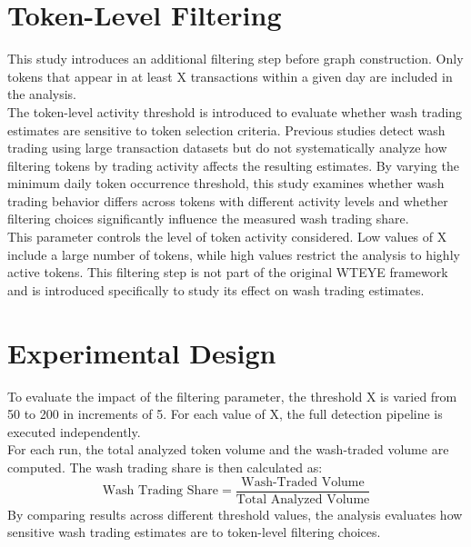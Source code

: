 \documentclass[language=english,thesis=bachelor,nosecondtitle,faculty=cb,onesided,13pt]{hsmw-thesis}
\begin{document}
	\section{Token-Level Filtering}
This study introduces an additional filtering step before graph construction. Only tokens that appear in at least X transactions within a given day are included in the analysis.\\
The token-level activity threshold is introduced to evaluate whether wash trading estimates are sensitive to token selection criteria. Previous studies detect wash trading using large transaction datasets but do not systematically analyze how filtering tokens by trading activity affects the resulting estimates. By varying the minimum daily token occurrence threshold, this study examines whether wash trading behavior differs across tokens with different activity levels and whether filtering choices significantly influence the measured wash trading share.\\
This parameter controls the level of token activity considered. Low values of X include a large number of tokens, while high values restrict the analysis to highly active tokens. This filtering step is not part of the original WTEYE framework and is introduced specifically to study its effect on wash trading estimates.\\

	\section{Experimental Design}
To evaluate the impact of the filtering parameter, the threshold X is varied from 50 to 200 in increments of 5. For each value of X, the full detection pipeline is executed independently.\\
For each run, the total analyzed token volume and the wash-traded volume are computed. The wash trading share is then calculated as:\\
\begin{equation}
    \text{Wash Trading Share} = \frac{\text{Wash-Traded Volume}}{\text{Total Analyzed Volume}}
    \label{eq:wash_trading_share}
\end{equation}
By comparing results across different threshold values, the analysis evaluates how sensitive wash trading estimates are to token-level filtering choices.

\end{document}
